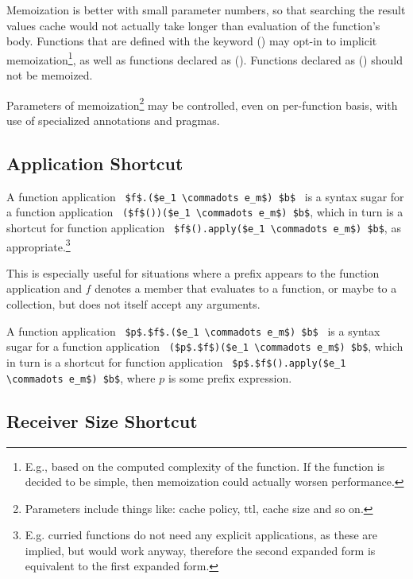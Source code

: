 Memoization is better with small parameter numbers, so that searching the result values cache would not actually take longer than evaluation of the function's body. Functions that are defined with the  keyword () may opt-in to implicit memoization\footnote{E.g., based on the computed complexity of the function. If the function is decided to be simple, then memoization could actually worsen performance.}, as well as functions declared as  (). Functions declared as  () should not be memoized. 

Parameters of memoization\footnote{Parameters include things like: cache policy, ttl, cache size and so on.} may be controlled, even on per-function basis, with use of specialized annotations and pragmas. 




\subsection{Application Shortcut}
\label{sec:function-application-shortcut}

A function application ~\lstinline!$f$.($e_1 \commadots e_m$) $b$!~ is a syntax sugar for a function application ~\lstinline!($f$())($e_1 \commadots e_m$) $b$!, which in turn is a shortcut for function application ~\lstinline!$f$().apply($e_1 \commadots e_m$) $b$!, as appropriate.\footnote{E.g. curried functions do not need any explicit  applications, as these are implied, but would work anyway, therefore the second expanded form is equivalent to the first expanded form.}

This is especially useful for situations where a prefix appears to the function application and $f$ denotes a member that evaluates to a function, or maybe to a collection, but does not itself accept any arguments. 

A function application ~\lstinline!$p$.$f$.($e_1 \commadots e_m$) $b$!~ is a syntax sugar for a function application ~\lstinline!($p$.$f$)($e_1 \commadots e_m$) $b$!, which in turn is a shortcut for function application ~\lstinline!$p$.$f$().apply($e_1 \commadots e_m$) $b$!, where $p$ is some prefix expression. 





\subsection{Receiver Size Shortcut}
\label{sec:receiver-size-shortcut}

